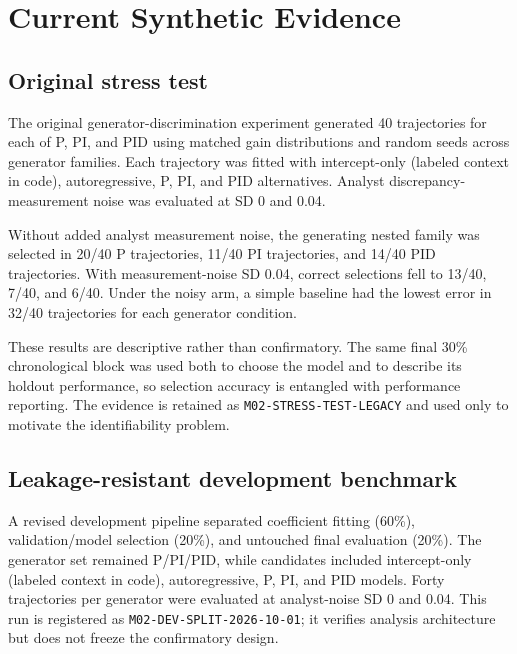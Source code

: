 \section{Current Synthetic Evidence}

\subsection{Original stress test}

The original generator-discrimination experiment generated 40 trajectories for each of P, PI, and PID using matched gain distributions and random seeds across generator families. Each trajectory was fitted with intercept-only (labeled context in code), autoregressive, P, PI, and PID alternatives. Analyst discrepancy-measurement noise was evaluated at SD 0 and 0.04.

Without added analyst measurement noise, the generating nested family was selected in 20/40 P trajectories, 11/40 PI trajectories, and 14/40 PID trajectories. With measurement-noise SD 0.04, correct selections fell to 13/40, 7/40, and 6/40. Under the noisy arm, a simple baseline had the lowest error in 32/40 trajectories for each generator condition.

These results are descriptive rather than confirmatory. The same final 30\% chronological block was used both to choose the model and to describe its holdout performance, so selection accuracy is entangled with performance reporting. The evidence is retained as \texttt{M02-STRESS-TEST-LEGACY} and used only to motivate the identifiability problem.

\subsection{Leakage-resistant development benchmark}

A revised development pipeline separated coefficient fitting (60\%), validation/model selection (20\%), and untouched final evaluation (20\%). The generator set remained P/PI/PID, while candidates included intercept-only (labeled context in code), autoregressive, P, PI, and PID models. Forty trajectories per generator were evaluated at analyst-noise SD 0 and 0.04. This run is registered as \texttt{M02-DEV-SPLIT-2026-10-01}; it verifies analysis architecture but does not freeze the confirmatory design.

